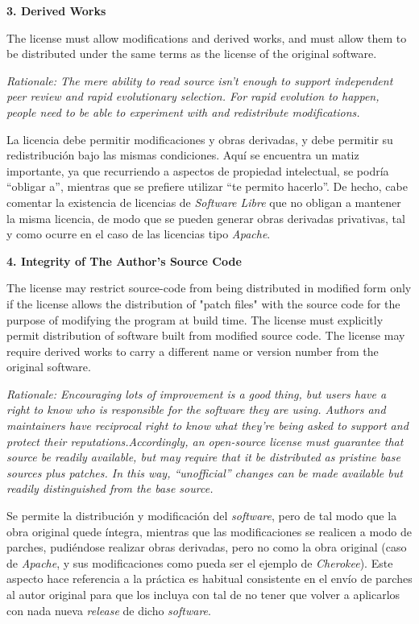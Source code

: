 {\bf 3. Derived Works

The license must allow modifications and derived works, and must allow them to
be distributed under the same terms as the license of the original software.}

\textit{Rationale: The mere ability to read source isn't enough to support
independent peer review and rapid evolutionary selection. For rapid evolution to
happen, people need to be able to experiment with and redistribute
modifications.}\newline

La licencia debe permitir modificaciones y obras derivadas, y debe permitir su
redistribución bajo las mismas condiciones. Aquí se encuentra un matiz
importante, ya que recurriendo a aspectos de propiedad intelectual, se podría
``obligar a'', mientras que se prefiere utilizar ``te permito
hacerlo''. De hecho, cabe comentar la existencia de licencias de
\textit{Software Libre} que no obligan a mantener la misma licencia, de modo que
se pueden generar obras derivadas privativas, tal y como ocurre en el caso de
las licencias tipo \textit{Apache}.\newline

{\bf 4. Integrity of The Author's Source Code

The license may restrict source-code from being distributed in modified form
only if the license allows the distribution of "patch files" with the source
code for the purpose of modifying the program at build time. The license must
explicitly permit distribution of software built from modified source code. The
license may require derived works to carry a different name or version number
from the original software.}

\textit{Rationale: Encouraging lots of improvement is a good thing, but users
have a right to know who is responsible for the software they are using. Authors
and maintainers have reciprocal right to know what they're being asked to
support and protect their reputations.\newline Accordingly, an open-source
license must guarantee that source be readily available, but may require that it
be distributed as pristine base sources plus patches. In this way,
``unofficial'' changes can be made available but readily distinguished from the
base source.}\newline

Se permite la distribución y modificación del \textit{software}, pero de tal
modo que la obra original quede íntegra, mientras que las modificaciones se
realicen a modo de parches, pudiéndose realizar obras derivadas, pero no como la
obra original (caso de \textit{Apache}, y sus modificaciones como pueda ser el
ejemplo de \textit{Cherokee}). Este aspecto hace referencia a la práctica es
habitual consistente en el envío de parches al autor original para que los
incluya con tal de no tener que volver a aplicarlos con nada nueva
\textit{release} de dicho \textit{software}.\newline

